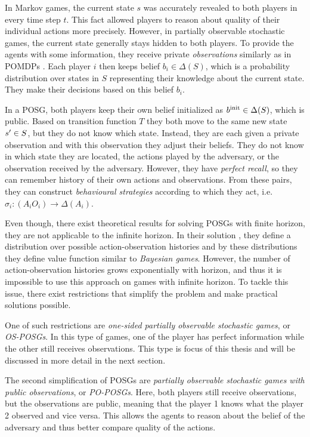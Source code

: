 \documentclass[../main.tex]{subfiles}
\begin{document}
In Markov games, the current state $s$ was accurately revealed to both players in every time step $t$.
This fact allowed players to reason about quality of their individual actions more precisely.
However, in partially observable stochastic games, the current state generally stays hidden to both players.
To provide the agents with some information, they receive private \textit{observations} similarly as in POMDPs .
Each player $i$ then keeps belief $b_i \in \Delta(S)$, which is a probability distribution over states in $S$ representing their knowledge about the current state.
They make their decisions based on this belief $b_i$.

In a POSG, both players keep their own belief initialized as $b^{\text{init}} \in \Delta(S)$, which is public.
Based on transition function $T$ they both move to the same new state $s^{\prime} \in S$, but they do not know which state.
Instead, they are each given a private observation and with this observation they adjust their beliefs.
They do not know in which state they are located, the actions played by the adversary, or the observation received by the adversary.
However, they have \textit{perfect recall}, so they can remember history of their own actions and observations.
From these pairs, they can construct \textit{behavioural strategies} according to which they act, i.e. $\sigma_i : (A_iO_i) \to \Delta(A_i)$.

Even though, there exist theoretical results for solving POSGs with finite horizon, they are not applicable to the infinite horizon\cite{posg}.
In their solution \cite{posg}, they define a distribution over possible action-observation histories and by these distributions they define value function similar to \textit{Bayesian games}.
However, the number of action-observation histories grows exponentially with horizon, and thus it is impossible to use this approach on games with infinite horizon.
To tackle this issue, there exist restrictions that simplify the problem and make practical solutions possible.

One of such restrictions are \textit{one-sided partially observable stochastic games}, or \textit{OS-POSGs}\cite{osposgs}.
In this type of games, one of the player has perfect information while the other still receives observations.
This type is focus of this thesis and will be discussed in more detail in the next section.

The second simplification of POSGs are \textit{partially observable stochastic games with public observations}, or \textit{PO-POSGs}\cite{poposgs}.
Here, both players still receive observations, but the observations are public, meaning that the player 1 knows what the player 2 observed and vice versa.
This allows the agents to reason about the belief of the adversary and thus better compare quality of the actions.
\end{document}
